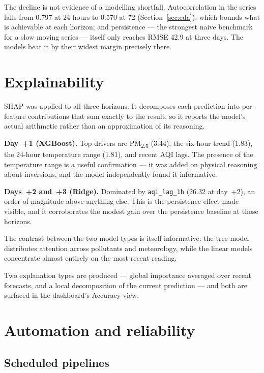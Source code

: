 \documentclass[11pt,a4paper]{article}
\begin{document}
The decline is not evidence of a modelling shortfall. Autocorrelation in
the series falls from 0.797 at 24 hours to 0.570 at 72
(Section~\ref{sec:eda}), which bounds what is achievable at each
horizon; and persistence --- the strongest naive benchmark for a slow
moving series --- itself only reaches RMSE 42.9 at three days. The
models beat it by their widest margin precisely there.

\section{Explainability}

SHAP was applied to all three horizons. It decomposes each prediction
into per-feature contributions that sum exactly to the result, so it
reports the model's actual arithmetic rather than an approximation of
its reasoning.

\textbf{Day~+1 (XGBoost).} Top drivers are PM\textsubscript{2.5} (3.44),
the six-hour trend (1.83), the 24-hour temperature range (1.81), and
recent AQI lags. The presence of the temperature range is a useful
confirmation --- it was added on physical reasoning about inversions,
and the model independently found it informative.

\textbf{Days~+2 and~+3 (Ridge).} Dominated by \texttt{aqi\_lag\_1h}
(26.32 at day~+2), an order of magnitude above anything else. This is
the persistence effect made visible, and it corroborates the modest gain
over the persistence baseline at those horizons.

The contrast between the two model types is itself informative: the tree
model distributes attention across pollutants and meteorology, while the
linear models concentrate almost entirely on the most recent reading.

Two explanation types are produced --- global importance averaged over
recent forecasts, and a local decomposition of the current prediction
--- and both are surfaced in the dashboard's Accuracy view.

\section{Automation and reliability}

\subsection{Scheduled pipelines}
\end{document}
